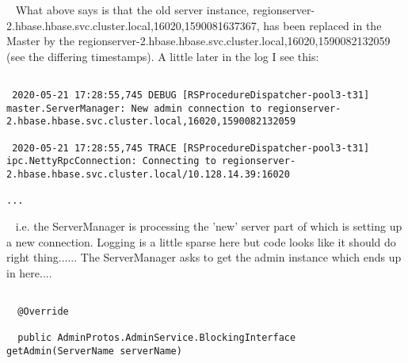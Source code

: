 \documentclass{report}%
\begin{document}
\begin{enumerate}
\begin{lstlisting}
\end{lstlisting} \ \newline%
\newline%
\newline%
\newline%
What above says is that the old server instance, regionserver{-}2.hbase.hbase.svc.cluster.local,16020,1590081637367, has been replaced in the Master by the regionserver{-}2.hbase.hbase.svc.cluster.local,16020,1590082132059 (see the differing timestamps).\newline%
\newline%
\newline%
\newline%
A little later in the log I see this:\newline%
\newline%
\newline%
\newline%
\begin{lstlisting}

 2020-05-21 17:28:55,745 DEBUG [RSProcedureDispatcher-pool3-t31] master.ServerManager: New admin connection to regionserver-2.hbase.hbase.svc.cluster.local,16020,1590082132059

 2020-05-21 17:28:55,745 TRACE [RSProcedureDispatcher-pool3-t31] ipc.NettyRpcConnection: Connecting to regionserver-2.hbase.hbase.svc.cluster.local/10.128.14.39:16020

...

\end{lstlisting} \ \newline%
\newline%
\newline%
\newline%
i.e. the ServerManager is processing the 'new' server part of which is setting up a new connection.\newline%
\newline%
\newline%
\newline%
Logging is a little sparse here but code looks like it should do right thing...... The ServerManager asks to get the admin instance which ends up in here....\newline%
\newline%
\newline%
\newline%
\begin{lstlisting}

  @Override

  public AdminProtos.AdminService.BlockingInterface getAdmin(ServerName serverName)


\end{lstlisting}
\end{enumerate}
\end{document}
